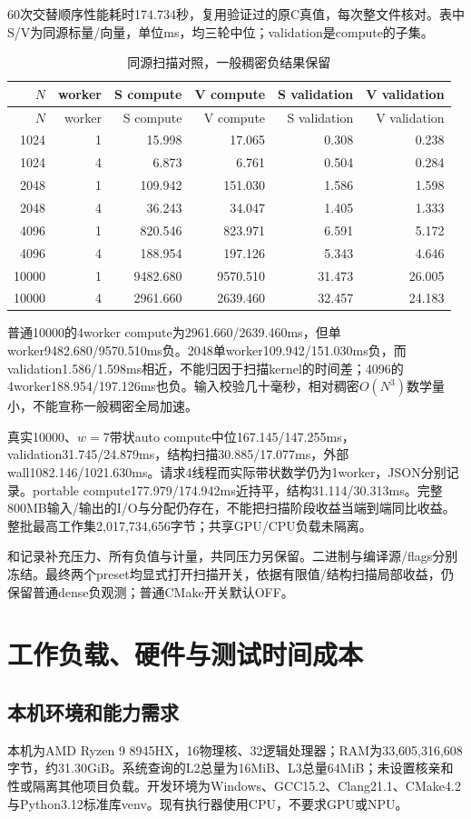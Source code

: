 \documentclass[UTF8,a4paper,11pt]{ctexart}
\begin{document}
60次交替顺序性能耗时174.734秒，复用验证过的原C真值，每次整文件核对。表中S/V为同源标量/向量，单位ms，均三轮中位；validation是compute的子集。
\begin{longtable}{@{}rr rrrr@{}}
\caption{同源扫描对照，一般稠密负结果保留}\\\toprule
$N$&worker&S compute&V compute&S validation&V validation\\\midrule\endfirsthead
\toprule$N$&worker&S compute&V compute&S validation&V validation\\\midrule\endhead
1024&1&15.998&17.065&0.308&0.238\\
1024&4&6.873&6.761&0.504&0.284\\
2048&1&109.942&151.030&1.586&1.598\\
2048&4&36.243&34.047&1.405&1.333\\
4096&1&820.546&823.971&6.591&5.172\\
4096&4&188.954&197.126&5.343&4.646\\
10000&1&9482.680&9570.510&31.473&26.005\\
10000&4&2961.660&2639.460&32.457&24.183\\
\bottomrule\end{longtable}

普通10000的4worker compute为2961.660/2639.460ms，但单worker9482.680/9570.510ms负。2048单worker109.942/151.030ms负，而validation1.586/1.598ms相近，不能归因于扫描kernel的时间差；4096的4worker188.954/197.126ms也负。输入校验几十毫秒，相对稠密$O(N^3)$数学量小，不能宣称一般稠密全局加速。

真实10000、$w=7$带状auto compute中位167.145/147.255ms，validation31.745/24.879ms，结构扫描30.885/17.077ms，外部wall1082.146/1021.630ms。请求4线程而实际带状数学仍为1worker，JSON分别记录。portable compute177.979/174.942ms近持平，结构31.114/30.313ms。完整800MB输入/输出的I/O与分配仍存在，不能把扫描阶段收益当端到端同比收益。整批最高工作集2,017,734,656字节；共享GPU/CPU负载未隔离。

和记录补充压力、所有负值与计量，共同压力另保留。二进制与编译源/flags分别冻结。最终两个preset均显式打开扫描开关，依据有限值/结构扫描局部收益，仍保留普通dense负观测；普通CMake开关默认OFF。

\section{工作负载、硬件与测试时间成本}
\subsection{本机环境和能力需求}
本机为AMD Ryzen 9 8945HX，16物理核、32逻辑处理器；RAM为33,605,316,608字节，约31.30GiB。系统查询的L2总量为16MiB、L3总量64MiB；未设置核亲和性或隔离其他项目负载。开发环境为Windows、GCC15.2、Clang21.1、CMake4.2与Python3.12标准库venv。现有执行器使用CPU，不要求GPU或NPU。
\end{document}
